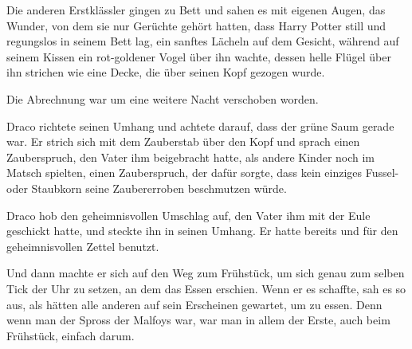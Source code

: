 Die anderen Erstklässler gingen zu Bett und sahen es mit eigenen Augen, das Wunder, von dem sie nur Gerüchte gehört hatten, dass Harry Potter still und regungslos in seinem Bett lag, ein sanftes Lächeln auf dem Gesicht, während auf seinem Kissen ein rot-goldener Vogel über ihn wachte, dessen helle Flügel über ihn strichen wie eine Decke, die über seinen Kopf gezogen wurde.

Die Abrechnung war um eine weitere Nacht verschoben worden.


Draco richtete seinen Umhang und achtete darauf, dass der grüne Saum gerade war. Er strich sich mit dem Zauberstab über den Kopf und sprach einen Zauberspruch, den Vater ihm beigebracht hatte, als andere Kinder noch im Matsch spielten, einen Zauberspruch, der dafür sorgte, dass kein einziges Fussel- oder Staubkorn seine Zaubererroben beschmutzen würde.

Draco hob den geheimnisvollen Umschlag auf, den Vater ihm mit der Eule geschickt hatte, und steckte ihn in seinen Umhang. Er hatte bereits  und  für den geheimnisvollen Zettel benutzt.

Und dann machte er sich auf den Weg zum Frühstück, um sich genau zum selben Tick der Uhr zu setzen, an dem das Essen erschien. Wenn er es schaffte, sah es so aus, als hätten alle anderen auf sein Erscheinen gewartet, um zu essen. Denn wenn man der Spross der Malfoys war, war man in allem der Erste, auch beim Frühstück, einfach darum.

